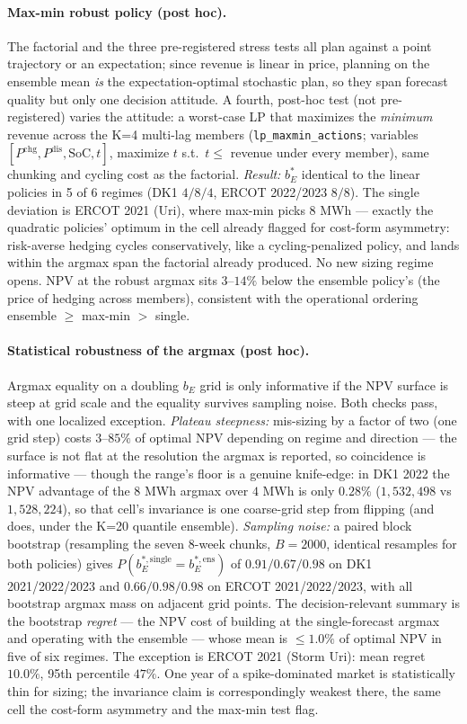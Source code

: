 \documentclass[11pt]{article}
\begin{document}
\paragraph{Max-min robust policy (post hoc).} The factorial and the
three pre-registered stress tests all plan against a point trajectory
or an expectation; since revenue is linear in price, planning on the
ensemble mean \emph{is} the expectation-optimal stochastic plan, so
they span forecast quality but only one decision attitude. A fourth,
post-hoc test (not pre-registered) varies the attitude: a worst-case
LP that maximizes the \emph{minimum} revenue across the K=4 multi-lag
members (\texttt{lp\_maxmin\_actions}; variables $[P^{\mathrm{chg}},
P^{\mathrm{dis}}, \mathrm{SoC}, t]$, maximize $t$ s.t.\ $t \leq$
revenue under every member), same chunking and cycling cost as the
factorial. \emph{Result:} $b_E^*$ identical to the linear policies in
5 of 6 regimes (DK1 $4/8/4$, ERCOT 2022/2023 $8/8$). The single
deviation is ERCOT 2021 (Uri), where max-min picks $8$ MWh ---
exactly the quadratic policies' optimum in the cell already flagged
for cost-form asymmetry: risk-averse hedging cycles conservatively,
like a cycling-penalized policy, and lands within the argmax span the
factorial already produced. No new sizing regime opens. NPV at the
robust argmax sits $3$--$14\%$ below the ensemble policy's (the price
of hedging across members), consistent with the operational ordering
ensemble $\geq$ max-min $>$ single.

\paragraph{Statistical robustness of the argmax (post hoc).} Argmax
equality on a doubling $b_E$ grid is only informative if the NPV
surface is steep at grid scale and the equality survives sampling
noise. Both checks pass, with one localized exception. \emph{Plateau
steepness:} mis-sizing by a factor of two (one grid step) costs
$3$--$85\%$ of optimal NPV depending on regime and direction --- the
surface is not flat at the resolution the argmax is reported, so
coincidence is informative --- though the range's floor is a genuine knife-edge: in DK1 2022 the NPV advantage of the $8$ MWh argmax over $4$ MWh is only $0.28\%$ ($1{,}532{,}498$ vs $1{,}528{,}224$), so that cell's invariance is one coarse-grid step from flipping (and does, under the K=20 quantile ensemble). \emph{Sampling noise:} a paired block
bootstrap (resampling the seven 8-week chunks, $B = 2000$, identical
resamples for both policies) gives $P(b_E^{*,\mathrm{single}} =
b_E^{*,\mathrm{ens}})$ of $0.91/0.67/0.98$ on DK1 2021/2022/2023 and
$0.66/0.98/0.98$ on ERCOT 2021/2022/2023, with all bootstrap argmax
mass on adjacent grid points. The decision-relevant summary is the
bootstrap \emph{regret} --- the NPV cost of building at the
single-forecast argmax and operating with the ensemble --- whose mean
is $\leq 1.0\%$ of optimal NPV in five of six regimes. The exception
is ERCOT 2021 (Storm Uri): mean regret $10.0\%$, 95th percentile
$47\%$. One year of a spike-dominated market is statistically thin for
sizing; the invariance claim is correspondingly weakest there, the
same cell the cost-form asymmetry and the max-min test flag.
\end{document}
